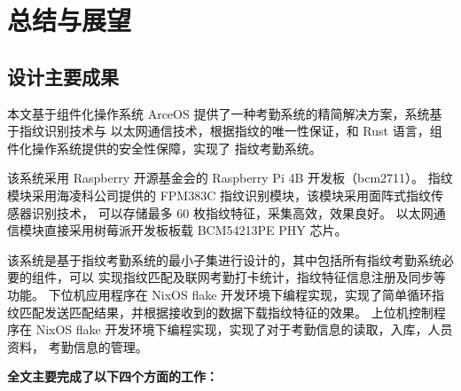\section{总结与展望}

    \subsection{设计主要成果}

    本文基于组件化操作系统 ArceOS 提供了一种考勤系统的精简解决方案，系统基于指纹识别技术与
    以太网通信技术，根据指纹的唯一性保证，和 Rust 语言，组件化操作系统提供的安全性保障，实现了
    指纹考勤系统。

    该系统采用 Raspberry 开源基金会的 Raspberry Pi 4B 开发板（bcm2711）。
    指纹模块采用海凌科公司提供的 FPM383C 指纹识别模块，该模块采用面阵式指纹传感器识别技术，
    可以存储最多 60 枚指纹特征，采集高效，效果良好。
    以太网通信模块直接采用树莓派开发板板载 BCM54213PE PHY 芯片。

    该系统是基于指纹考勤系统的最小子集进行设计的，其中包括所有指纹考勤系统必要的组件，可以
    实现指纹匹配及联网考勤打卡统计，指纹特征信息注册及同步等功能。
    下位机应用程序在 NixOS flake 开发环境下编程实现，实现了简单循环指纹匹配发送匹配结果，并根据接收到的数据下载指纹特征的效果。
    上位机控制程序在 NixOS flake 开发环境下编程实现，实现了对于考勤信息的读取，入库，人员资料，
    考勤信息的管理。

    \noindent \textbf{全文主要完成了以下四个方面的工作：}

